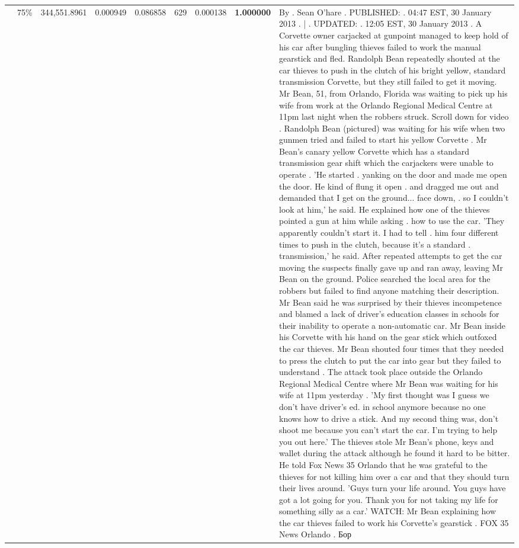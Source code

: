 \begin{table}[H]
\begin{tabular}{llrrrrrrl}
 & 75\% & 344,551.8961 & 0.000949 & 0.086858 & \color{red} 629 & 0.000138 & \bfseries \color{red} 1.000000 & By . Sean O'hare . PUBLISHED: . 04:47 EST, 30 January 2013 . | . UPDATED: . 12:05 EST, 30 January 2013 . A Corvette owner carjacked at gunpoint managed to keep hold of his car after bungling thieves failed to work the manual gearstick and fled. Randolph Bean repeatedly shouted at the car thieves to push in the clutch of his bright yellow, standard transmission Corvette, but they still failed to get it moving. Mr Bean, 51, from Orlando, Florida was waiting to pick up his wife from work at the Orlando Regional Medical Centre at 11pm last night when the robbers struck. Scroll down for video . Randolph Bean (pictured) was waiting for his wife when two gunmen tried and failed to start his yellow Corvette . Mr Bean's canary yellow Corvette which has a standard transmission gear shift which the carjackers were unable to operate . 'He started . yanking on the door and made me open the door. He kind of flung it open . and dragged me out and demanded that I get on the ground... face down, . so I couldn't look at him,' he said. He explained how one of the thieves pointed a gun at him while asking . how to use the car. 'They apparently couldn't start it. I had to tell . him four different times to push in the clutch, because it's a standard . transmission,' he said. After repeated attempts to get the car moving the suspects finally gave up and ran away, leaving Mr Bean on the ground. Police searched the local area for the robbers but failed to find anyone matching their description. Mr Bean said he was surprised by their thieves incompetence and blamed a lack of driver's education classes in schools for their inability to operate a non-automatic car. Mr Bean inside his Corvette with his hand on the gear stick which outfoxed the car thieves. Mr Bean shouted four times that they needed to press the clutch to put the car into gear but they failed to understand . The attack took place outside the Orlando Regional Medical Centre where Mr Bean was waiting for his wife at 11pm yesterday . 'My first thought was I guess we don't have driver's ed. in school anymore because no one knows how to drive a stick. And my second thing was, don't shoot me because you can't start the car. I'm trying to help you out here.' The thieves stole Mr Bean's phone, keys and wallet during the attack although he found it hard to be bitter. He told Fox News 35 Orlando that he was grateful to the thieves for not killing him over a car and that they should turn their lives around. 'Guys turn your life around. You guys have got a lot going for you. Thank you for not taking my life for something silly as a car.' WATCH: Mr Bean explaining how the car thieves failed to work his Corvette's gearstick . FOX 35 News Orlando . Бор \\

\end{tabular}
\end{table}
